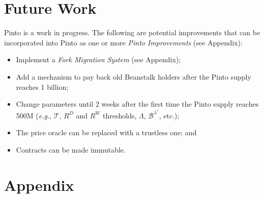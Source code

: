 \documentclass[tikz]{article}
\newcommand{\term}[1]{\textsl{#1}}
\begin{document}
\section{Future Work}

Pinto is a work in progress. The following are potential improvements that can be incorporated into Pinto as one or more \term{Pinto Improvements} (see Appendix):

\begin{itemize}
    \item Implement a \term{Fork Migration System} (see Appendix);
    \item Add a mechanism to pay back old Beanstalk holders after the Pinto supply reaches 1 billion;
    \item Change parameters until 2 weeks after the first time the Pinto supply reaches 500M (\textit{e.g.}, $\mathscr{T}$, $R^{D}$ and $R^{W}$ thresholds, $\Lambda$, $\mathscr{B}^{\lambda^{*}}$, etc.);
    \item The price oracle can be replaced with a trustless one; and
    \item Contracts can be made immutable.
\end{itemize}


\newpage
\section{Appendix}

\newpage

\newpage

\newpage

\newpage

\newpage

\newpage

\newpage

\newpage

\newpage

\newpage

\newpage

\newpage

\newpage

\newpage
\end{document}

